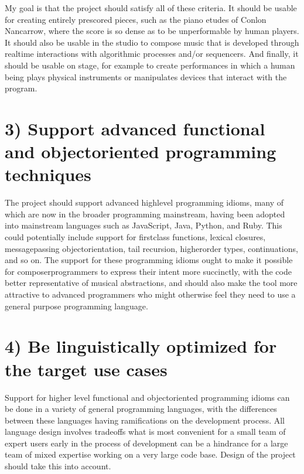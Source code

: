 \documentclass[letterpaper,10pt,english]{sphinxmanual}
\begin{document}
\sphinxAtStartPar
My goal is that the project should satisfy all of these criteria.
It should be usable for creating entirely pre\sphinxhyphen{}scored pieces, such as the piano etudes of Conlon Nancarrow,
where the score is so dense as to be unperformable by human players.
It should also be usable in the studio to compose music that is developed through realtime interactions with
algorithmic processes and/or sequencers.
And finally, it should be usable on stage, for example to create performances in which a human being plays
physical instruments or manipulates devices that interact with the program.


\section{3) Support advanced functional and object\sphinxhyphen{}oriented programming techniques}
\label{\detokenize{goals:support-advanced-functional-and-object-oriented-programming-techniques}}
\sphinxAtStartPar
The project should support advanced high\sphinxhyphen{}level programming idioms, many of which are now in the broader
programming mainstream, having been adopted into mainstream languages such as JavaScript, Java, Python, and Ruby.
This could potentially include support for first\sphinxhyphen{}class functions, lexical closures,
message\sphinxhyphen{}passing object\sphinxhyphen{}orientation, tail recursion, higher\sphinxhyphen{}order types, continuations, and so on.
The support for these programming idioms ought to make it possible for composer\sphinxhyphen{}programmers to express
their intent more succinctly, with the code better representative of musical abstractions, and should
also make the tool more attractive to advanced programmers who might otherwise
feel they need to use a general purpose programming language.


\section{4) Be linguistically optimized for the target use cases}
\label{\detokenize{goals:be-linguistically-optimized-for-the-target-use-cases}}
\sphinxAtStartPar
Support for higher level functional and object\sphinxhyphen{}oriented programming idioms can be done in a variety of
general programming languages, with the differences between these languages having ramifications on the development process.
All language design involves tradeoffs \sphinxhyphen{} what is most convenient for a small team of expert users early
in the process of development can be a hindrance for a large team of mixed expertise working on a very large code base.
Design of the project should take this into account.
\end{document}
